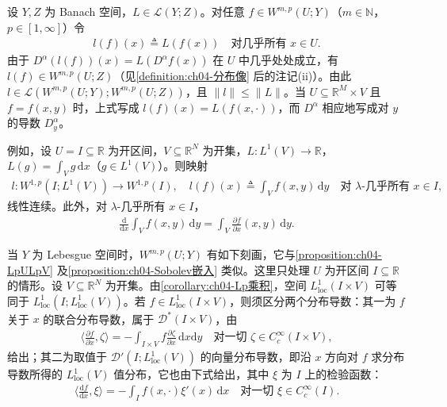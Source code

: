 \documentclass[../../main.tex]{subfiles}%
\begin{document}
\begin{remark}\label{remark:ch04-Sobolev算子}
设 $Y,Z$ 为 Banach 空间，$L\in\mathcal{L}(Y;Z)$。对任意 $f\in W^{m,p}(U;Y)$（$m\in\mathbb{N}$，$p\in[1,\infty]$）令
\begin{align*}
l(f)(x)\triangleq L(f(x))\quad\text{对几乎所有 }x\in U .
\end{align*}
由于 $D^\alpha(l(f))(x)=L(D^\alpha f(x))$ 在 $U$ 中几乎处处成立，有 $l(f)\in W^{m,p}(U;Z)$（见\cref{definition:ch04-分布像} 后的注记(ii)）。由此 $l\in\mathcal{L}(W^{m,p}(U;Y);W^{m,p}(U;Z))$，且 $\|l\|\leqslant\|L\|$。当 $U\subseteq\mathbb{R}^M\times V$ 且 $f=f(x,y)$ 时，上式写成 $l(f)(x)=L(f(x,\cdot))$，而 $D^\alpha$ 相应地写成对 $y$ 的导数 $D_y^\alpha$。

例如，设 $U=I\subseteq\mathbb{R}$ 为开区间，$V\subseteq\mathbb{R}^N$ 为开集，$L:L^1(V)\to\mathbb{R}$，$L(g)=\int_Vg\,\mathrm{d}x$（$g\in L^1(V)$）。则映射
\begin{align*}
l:W^{1,p}(I;L^1(V))\to W^{1,p}(I),\quad l(f)(x)\triangleq\int_Vf(x,y)\,\mathrm{d}y\quad\text{对 }\lambda\text{-几乎所有 }x\in I,
\end{align*}
线性连续。此外，对 $\lambda$-几乎所有 $x\in I$，
\begin{align*}
\frac{\mathrm{d}}{\mathrm{d}x}\int_Vf(x,y)\,\mathrm{d}y=\int_V\frac{\partial f}{\partial x}(x,y)\,\mathrm{d}y .
\end{align*}
\end{remark}

当 $Y$ 为 Lebesgue 空间时，$W^{m,p}(U;Y)$ 有如下刻画，它与\cref{proposition:ch04-LpULpV} 及\cref{proposition:ch04-Sobolev嵌入} 类似。这里只处理 $U$ 为开区间 $I\subseteq\mathbb{R}$ 的情形。设 $V\subseteq\mathbb{R}^N$ 为开集。由\cref{corollary:ch04-Lp乘积}，空间 $L^1_{\mathrm{loc}}(I\times V)$ 可等同于 $L^1_{\mathrm{loc}}(I;L^1_{\mathrm{loc}}(V))$。若 $f\in L^1_{\mathrm{loc}}(I\times V)$，则须区分两个分布导数：其一为 $f$ 关于 $x$ 的联合分布导数，属于 $\mathcal{D}^*(I\times V)$，由
\begin{align}
\Big\langle\frac{\partial f}{\partial x},\zeta\Big\rangle=-\int_{I\times V}f\frac{\partial\zeta}{\partial x}\,\mathrm{d}x\mathrm{d}y\quad\text{对一切 }\zeta\in C_c^\infty(I\times V), \label{align:ch04-4.126}
\end{align}
给出；其二为取值于 $\mathcal{D}'(I;L^1_{\mathrm{loc}}(V))$ 的向量分布导数，即沿 $x$ 方向对 $f$ 求分布导数所得的 $L^1_{\mathrm{loc}}(V)$ 值分布，它也由下式给出，其中 $\xi$ 为 $I$ 上的检验函数：
\begin{align}
\Big\langle\frac{\mathrm{d}f}{\mathrm{d}x},\xi\Big\rangle=-\int_If(x,\cdot)\xi'(x)\,\mathrm{d}x\quad\text{对一切 }\xi\in C_c^\infty(I). \label{align:ch04-4.127}
\end{align}
\end{document}
